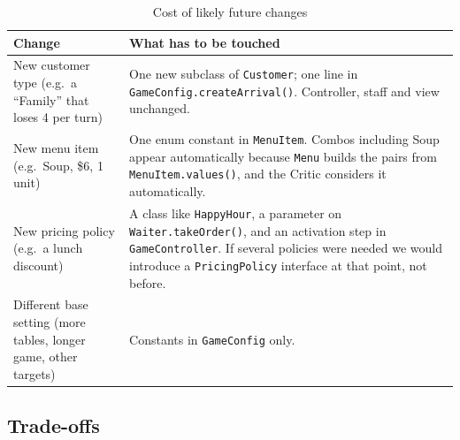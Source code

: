 \begin{table}[H]
\centering
\small
\begin{tabularx}{\textwidth}{>{\raggedright\arraybackslash}p{3.8cm}X}
\toprule
\textbf{Change} & \textbf{What has to be touched} \\
\midrule
New customer type (e.g.\ a ``Family'' that loses 4 per turn) & One new subclass of \texttt{Customer}; one line in \texttt{GameConfig.createArrival()}. Controller, staff and view unchanged. \\
New menu item (e.g.\ Soup, \$6, 1 unit) & One enum constant in \texttt{MenuItem}. Combos including Soup appear automatically because \texttt{Menu} builds the pairs from \texttt{MenuItem.values()}, and the Critic considers it automatically. \\
New pricing policy (e.g.\ a lunch discount) & A class like \texttt{HappyHour}, a parameter on \texttt{Waiter.takeOrder()}, and an activation step in \texttt{GameController}. If several policies were needed we would introduce a \texttt{PricingPolicy} interface at that point, not before. \\
Different base setting (more tables, longer game, other targets) & Constants in \texttt{GameConfig} only. \\
\bottomrule
\end{tabularx}
\caption{Cost of likely future changes}
\end{table}

\subsection{Trade-offs}

